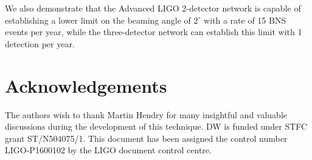 \documentclass[twocolumn,nofootinbib]{revtex4-1}
\newcommand{\grbrate}{{{\mathcal R}_{\mathrm{grb}}}}
\newcommand{\cbcrate}{{{\mathcal R}}}
\newcommand{\diff}{{\mathrm d}}
\begin{document}
We also demonstrate that the Advanced LIGO 2-detector network is
capable of establishing a lower limit on the beaming angle of
$2^{\circ}$ with a rate of 15 BNS events per year, while the
three-detector network can establish this limit with 1 detection per
year.

\section{Acknowledgements}
\label{sec:ackn}
The authors wish to thank Martin Hendry for many insightful and
valuable discussions during the development of this technique. DW is
funded under STFC grant ST/N504075/1. This document has been assigned the
control number LIGO-P1600102 by the LIGO document control centre.

\end{document}
